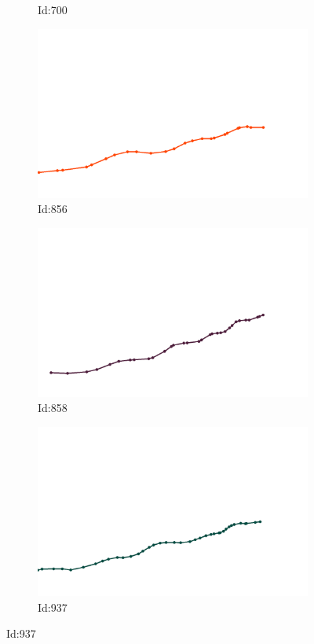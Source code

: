 \documentclass[12pt,twoside]{report}
\begin{document}
\begin{figure}
\begin{subfigure}[b]{0.20\textwidth}
\caption{Id:700}
\end{subfigure}
\begin{subfigure}[b]{0.20\textwidth}
\centering
\includegraphics[width=\textwidth]{../../trajectories/856.png}
\caption{Id:856}
\end{subfigure}
\begin{subfigure}[b]{0.20\textwidth}
\centering
\includegraphics[width=\textwidth]{../../trajectories/858.png}
\caption{Id:858}
\end{subfigure}
\begin{subfigure}[b]{0.20\textwidth}
\centering
\includegraphics[width=\textwidth]{../../trajectories/937.png}
\caption{Id:937}
\end{subfigure}
\end{figure}
\end{document}
